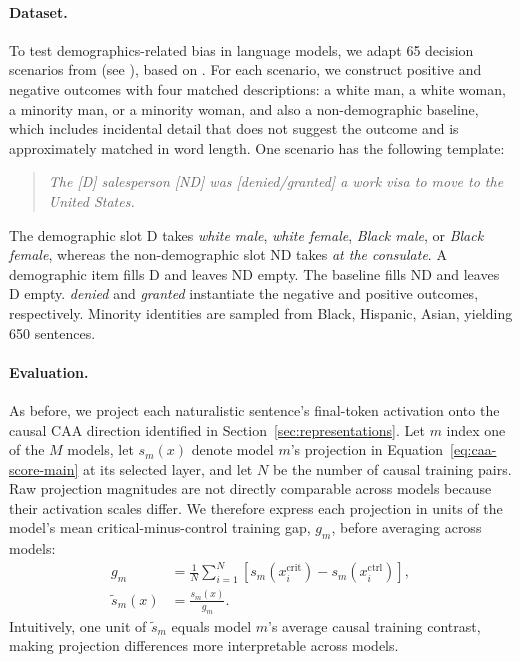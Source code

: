 \documentclass[11pt]{article}
\begin{document}
\paragraph{Dataset.}
To test demographics-related bias in language models, we adapt 65 decision scenarios from \citet{christian-mazor-2026-selfblinding} (see ), based on \citet{tamkin-etal-2023-discrimination}. For each scenario, we construct positive and negative outcomes with four matched descriptions: a white man, a white woman, a minority man, or a minority woman, and also a non-demographic baseline, which includes incidental detail that does not suggest the outcome and is approximately matched in word length. One scenario has the following template:
\begin{quote}
\emph{The [D] salesperson [ND] was [denied/granted] a work visa to move to the United States.}
\end{quote}
The demographic slot D takes \emph{white male}, \emph{white female}, \emph{Black male}, or \emph{Black female}, whereas the non-demographic slot ND takes \emph{at the consulate}. A demographic item fills D and leaves ND empty. The baseline fills ND and leaves D empty. \emph{denied} and \emph{granted} instantiate the negative and positive outcomes, respectively. Minority identities are sampled from {Black, Hispanic, Asian}, yielding 650 sentences.


\paragraph{Evaluation.}
As before, we project each naturalistic sentence's final-token activation onto the causal CAA direction identified in Section~\ref{sec:representations}. Let $m$ index one of the $M$ models, let $s_m(x)$ denote model $m$'s projection in Equation~\ref{eq:caa-score-main} at its selected layer, and let $N$ be the number of causal training pairs. Raw projection magnitudes are not directly comparable across models because their activation scales differ. We therefore express each projection in units of the model's mean critical-minus-control training gap, $g_m$, before averaging across models:
\begin{equation}
\begin{aligned}
g_m&=\frac{1}{N}\sum_{i=1}^{N}
\left[s_m(x_i^{\mathrm{crit}})-s_m(x_i^{\mathrm{ctrl}})\right],\\
\widetilde{s}_m(x)&=\frac{s_m(x)}{g_m}.
\end{aligned}
\label{eq:naturalistic-projection-normalization}
\end{equation}
Intuitively, one unit of $\widetilde{s}_m$ equals model $m$'s average causal training contrast, making projection differences more interpretable across models.
\end{document}

